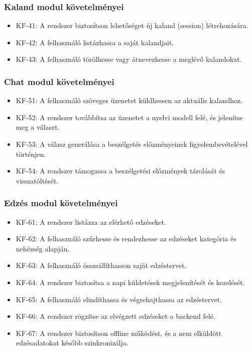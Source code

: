 \documentclass[
]{thesis-ekf}
\theoremstyle{definition}
\theoremstyle{remark}
\begin{document}
\subsubsection{Kaland modul követelményei}

\begin{itemize}
    \item KF-41: A rendszer biztosítson lehetőséget új kaland (session) létrehozására.
    \item KF-42: A felhasználó listázhassa a saját kalandjait.
    \item KF-43: A felhasználó törölhesse vagy átnevezhesse a meglévő kalandokat.
\end{itemize}

\subsubsection{Chat modul követelményei}

\begin{itemize}
    \item KF-51: A felhasználó szöveges üzenetet küldhessen az aktuális kalandhoz.
    \item KF-52: A rendszer továbbítsa az üzenetet a nyelvi modell felé, és jelenítse meg a választ.
    \item KF-53: A válasz generálása a beszélgetés előzményeinek figyelembevételével történjen.
    \item KF-54: A rendszer támogassa a beszélgetési előzmények tárolását és visszatöltését.
\end{itemize}

\subsubsection{Edzés modul követelményei}

\begin{itemize}
    \item KF-61: A rendszer listázza az elérhető edzéseket.
    \item KF-62: A felhasználó szűrhesse és rendezhesse az edzéseket kategória és nehézség alapján.
    \item KF-63: A felhasználó összeállíthasson saját edzéstervet.
    \item KF-64: A rendszer biztosítsa a napi küldetések megjelenítését és kezelését.
    \item KF-65: A felhasználó elindíthassa és végrehajthassa az edzéstervet.
    \item KF-66: A rendszer rögzítse az elvégzett edzéseket a backend felé.
    \item KF-67: A rendszer biztosítson offline működést, és a nem elküldött edzésadatokat később szinkronizálja.
\end{itemize}
\end{document}
